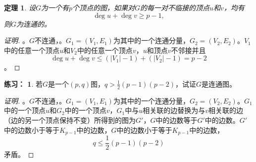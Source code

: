 \documentclass{beamer}
\newtheorem{Thm}{定理}[section]
\theoremstyle{definition}
\theoremstyle{example}
\newtheorem*{Exercise}{练习：}
\begin{document}
\begin{CJK}{UTF8}{gbsn}

\date{}
\author{陈建文}

\begin{frame}
  \begin{Thm}
    设$G$为一个有$p$个顶点的图，如果对$G$的每一对不临接的顶点$u$和$v$，均有
    \begin{equation*}
      \deg u + \deg v \geq p - 1,
    \end{equation*}
则$G$为连通的。
\end{Thm}
\begin{proof}[证明]\justifying\let\raggedright\justifying
  。$G$不连通，。$G_1=(V_1,E_1)$为其中的一个连通分量，$G_2=(V_2,E_2)$。$V_1$中的任意一个顶点$u$和$V_2$中的任意一个顶点$v$，$u$和顶点$v$不邻接并且
  \[\deg u + \deg v \leq (|V_1| - 1 ) + (|V_2| - 1) = p - 2\]
  。
\end{proof}
\end{frame}

\begin{frame}
  \begin{Exercise}
    若$G$是一个$(p,q)$图，$q > \frac{1}{2}(p-1)(p-2)$，试证$G$是连通图。  
    \end{Exercise}
    \begin{proof}[证明]\justifying\let\raggedright\justifying
      。$G$不连通，。$G_1=(V_1,E_1)$为其中的一个连通分量，$G_2=(V_2,E_2)$。$G_1$中的一个顶点$u$和$G_2$中的一个顶点$v$，$G_1$中与$u$相关联的边替换为与$v$相关联的边（边的另一个顶点保持不变）所得到的图为$G'$，$G$中的边数等于$G'$中的边数。$G'$中的边数小于等于$K_{p-1}$中的边数，$G$中的边数小于等于$K_{p-1}$中的边数，
       \[q\leq \frac{1}{2}(p-1)(p-2)\]
       矛盾。    
       \end{proof}
\end{frame}


\end{CJK}
\end{document}
